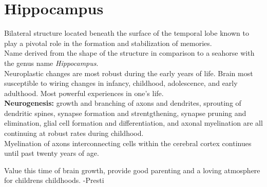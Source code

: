 \documentclass{article}
\begin{document}
\section{Hippocampus}
Bilateral structure located beneath the surface of the temporal lobe known to play a pivotal role in the formation and stabilization of memories. \\
Name derived from the shape of the structure in comparison to a seahorse with the genus name \textit{Hippocampus}. \\
Neuroplastic changes are most robust during the early years of life. Brain most susceptible to wiring changes in infancy, childhood, adolescence, and early adulthood. Most powerful experiences in one's life. \\
\textbf{Neurogenesis:} growth and branching of axons and dendrites, sprouting of dendritic spines, synapse formation and strentgthening, synapse pruning and elimination, glial cell formation and differentiation, and axonal myelination are all continuing at robust rates during childhood. \\
Myelination of axons interconnecting cells within the cerebral cortex continues until past twenty years of age. \\
\bigskip 

\begin{center}
    Value this time of brain growth, provide good parenting and a loving atmosphere for childrens childhoods. -Presti
\end{center}
\end{document}
